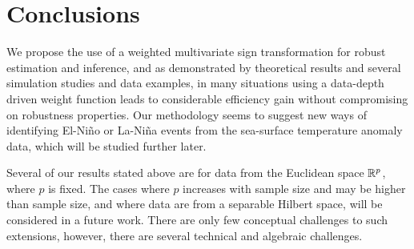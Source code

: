 \section{Conclusions}
\label{Sec:Conclusion}

We propose the use of a weighted multivariate sign transformation for robust 
estimation and inference, and as demonstrated by theoretical results and several 
simulation studies and data examples, in many situations using a data-depth driven weight 
function leads to considerable efficiency gain without compromising on robustness 
properties. Our methodology seems to suggest new ways of identifying 
El-Ni\~no or La-Ni\~na events from the sea-surface temperature anomaly data, 
which will be studied further later.

Several of our results stated above are for data from the Euclidean space ${\mathbb{R}}^{p}$, where 
$p$ is fixed. The cases where $p$ increases with sample size and may be higher than sample 
size, and where data are from a separable Hilbert space, will be considered in a future 
work. There are only few conceptual challenges to such extensions, however, there are 
several  technical and algebraic challenges. 

